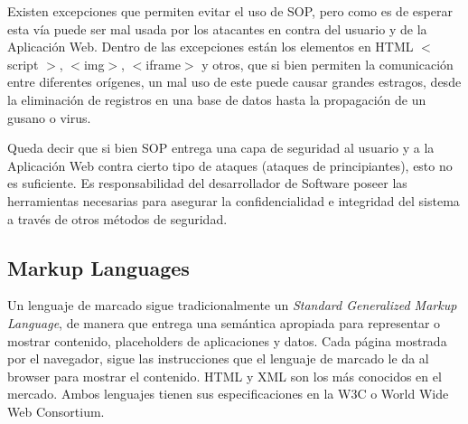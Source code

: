     Existen excepciones que permiten evitar el uso de SOP, pero como es de esperar esta vía puede ser mal usada por los atacantes en contra del usuario y de la Aplicación Web. Dentro de las excepciones están los elementos en HTML \(<\) script \(>\), \(<\)img\(>\), \(<\)iframe\(>\) y otros, que si bien permiten la comunicación entre diferentes orígenes, un mal uso de este puede causar grandes estragos, desde la eliminación de registros en una base de datos hasta la propagación de un gusano o virus.
        
    Queda decir que si bien SOP entrega una capa de seguridad al usuario y a la Aplicación Web contra cierto tipo de ataques (ataques de principiantes), esto no es suficiente. Es responsabilidad del desarrollador de Software poseer las herramientas necesarias para asegurar la confidencialidad e integridad del sistema a través de otros métodos de seguridad.
    


    \subsection{Markup Languages}
    \label{chap2:markup}
        Un lenguaje de marcado sigue tradicionalmente un \textit{Standard Generalized Markup Language}, de manera que entrega una semántica apropiada para representar o mostrar contenido, placeholders de aplicaciones y datos. Cada página mostrada por el navegador, sigue las instrucciones que el lenguaje de marcado le da al browser para mostrar el contenido. HTML y XML son los más conocidos en el mercado. Ambos lenguajes tienen sus especificaciones en la W3C o World Wide Web Consortium.

